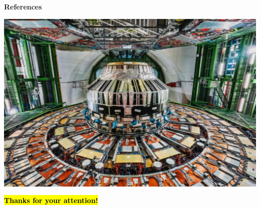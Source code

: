 \documentclass[aspectratio = 1610, xcolor = dvipsnames]{beamer}
\makeatletter
\let\HL\hl
\renewcommand\hl{%
  \let\set@color\beamerorig@set@color
  \let\reset@color\beamerorig@reset@color
  \HL}
\makeatother
\begin{document}
    
	\begin{frame}{\bf References}
		\footnotesize{\printbibliography}
	\end{frame}
	
	
	{\usebackgroundtemplate
    {\includegraphics[width=\paperwidth,height=\paperheight]{images/CMS-wallpaper2.pdf}}
	\begin{frame}
    	\thispagestyle{empty}
    	\vspace{-3.cm}
    	\begin{center}
            {\bf\Huge{\textcolor{unipd}{\hl{Thanks for your attention!}}}}
        \end{center}
	\end{frame}}
	
\end{document}
